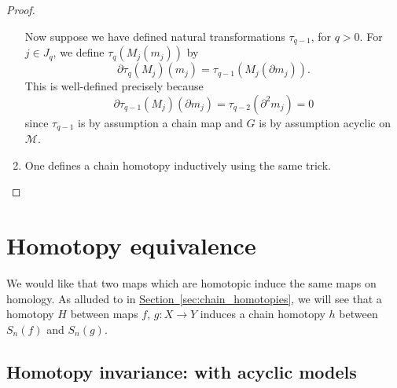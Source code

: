 \documentclass[main.tex]{subfiles}
\begin{document}
\begin{proof}
\begin{enumerate}
      Now suppose we have defined natural transformations $\tau_{q-1}$, for $q > 0$. For $j \in J_{q}$, we define $\tau_{q}(M_{j}(m_{j}))$ by
      \begin{equation*}
        \partial \tau_{q}(M_{j})(m_{j}) = \tau_{q-1}(M_{j}(\partial m_{j})).
      \end{equation*}
      This is well-defined precisely because
      \begin{equation*}
        \partial \tau_{q-1}(M_{j})(\partial m_{j}) = \tau_{q-2}(\partial^{2} m_{j}) = 0
      \end{equation*}
      since $\tau_{q-1}$ is by assumption a chain map and $G$ is by assumption acyclic on $\mathcal{M}$.

    \item One defines a chain homotopy inductively using the same trick.
  \end{enumerate}
\end{proof}

\section{Homotopy equivalence}
\label{sec:homotopy_equivalence}

We would like that two maps which are homotopic induce the same maps on homology. As alluded to in \hyperref[sec:chain_homotopies]{Section~\ref*{sec:chain_homotopies}}, we will see that a homotopy $H$ between maps $f$, $g\colon X \to Y$ induces a chain homotopy $h$ between $S_{n}(f)$ and $S_{n}(g)$.

\subsection{Homotopy invariance: with acyclic models}
\label{ssc:homotopy_invariance_with_acyclic_models}
\end{document}
